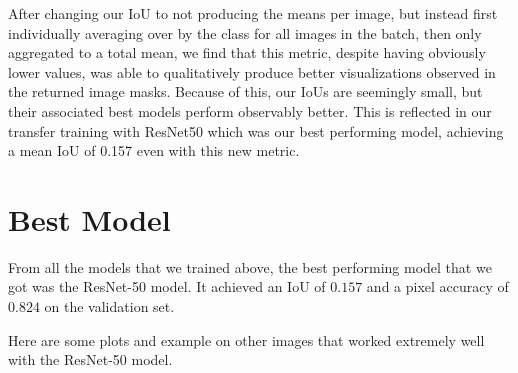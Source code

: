 \documentclass{article}
\begin{document}
After changing our IoU to not producing the means per image, but instead first individually averaging over by the class for all images in the batch, then only aggregated to a total mean, we find that this metric, despite having obviously lower values, was able to qualitatively produce better visualizations observed in the returned image masks. Because of this, our IoUs are seemingly small, but their associated best models perform observably better. This is reflected in our transfer training with ResNet50 which was our best performing model, achieving a mean IoU of 0.157 even with this new metric.


\newpage
\section{Best Model}
From all the models that we trained above, the best performing model that we got was the ResNet-50 model. It achieved an IoU of $0.157$ and a pixel accuracy of $0.824$ on the validation set. 

Here are some plots and example on other images that worked extremely well with the ResNet-50 model.
\end{document}
